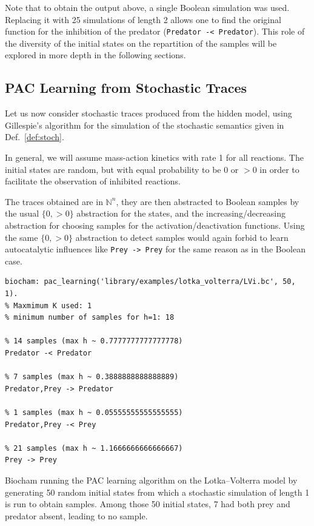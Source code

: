 \documentclass{llncs}
\begin{document}
Note that to obtain the output above, a single Boolean simulation was used.
Replacing it with 25 simulations of length 2 allows one to find the original
function for the inhibition of the predator (\texttt{Predator -< Predator}).
This role of the diversity of the initial states on the repartition of the
samples will be explored in more depth in the following sections.


\subsection{PAC Learning from Stochastic Traces}

Let us now consider stochastic traces
produced from the hidden model, using Gillespie's
algorithm for the simulation of the stochastic semantics given in
Def.~\ref{def:stoch}.

In general, we will assume mass-action kinetics with rate 1 for all reactions.
The initial states are random, but with equal probability to be 0 or $>0$ in
order to facilitate the observation of inhibited reactions.

The traces obtained are in ${\mathbb{N}}^n$, they are then abstracted to
Boolean samples by the usual $\{0, >0\}$ abstraction for the states, and the
increasing/decreasing abstraction for choosing samples for the
activation/deactivation functions. Using the same $\{0, >0\}$ abstraction to
detect samples would again forbid to learn autocatalytic influences like
\texttt{Prey -> Prey} for the same reason as in the Boolean case.

\begin{listfig}[htp]
   \begin{lstlisting}
biocham: pac_learning('library/examples/lotka_volterra/LVi.bc', 50, 1).
% Maxmimum K used: 1
% minimum number of samples for h=1: 18

% 14 samples (max h ~ 0.7777777777777778)
Predator -< Predator

% 7 samples (max h ~ 0.3888888888888889)
Predator,Prey -> Predator

% 1 samples (max h ~ 0.05555555555555555)
Predator,Prey -< Prey

% 21 samples (max h ~ 1.1666666666666667)
Prey -> Prey
   \end{lstlisting}
   \caption{Biocham running the PAC learning algorithm on the Lotka--Volterra
      model by generating 50 random initial states from which a stochastic
      simulation of length 1 is run to obtain samples. Among those 50 initial
     states, 7 had both prey and predator absent, leading to no sample.}%
   \label{lst:stoch_lv}
\end{listfig}
\end{document}
